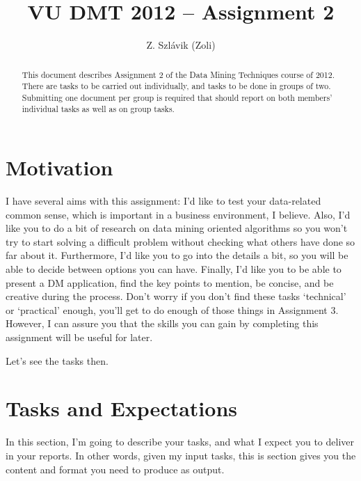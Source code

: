 \documentclass{llncs}
\begin{document}
%
%
%

\title{VU DMT 2012 -- Assignment 2}
\author{Z. Szl\'avik (Zoli)}


\maketitle              %

\begin{abstract}
This document describes Assignment 2 of the Data Mining Techniques course of 2012. There are tasks to be carried out individually, and tasks to be done in groups of two. Submitting one document per group is required that should report on both members' individual tasks as well as on group tasks.
\end{abstract}%
\section{Motivation}
I have several aims with this assignment: I'd like to test your data-related common sense, which is important in a business environment, I believe. Also, I'd like you to do a bit of research on data mining oriented algorithms so you won't try to start solving a difficult problem without checking what others have done so far about it. Furthermore, I'd like you to go into the details a bit, so you will be able to decide between options you can have. Finally, I'd like you to be able to present a DM application, find the key points to mention, be concise, and be creative during the process. Don't worry if you don't find these tasks `technical' or `practical' enough, you'll get to do enough of those things in Assignment 3. However, I can assure you that the skills you can gain by completing this assignment will be useful for later.

Let's see the tasks then.

\section{Tasks and Expectations}
In this section, I'm going to describe your tasks, and what I expect you to deliver in your reports. In other words, given my input tasks, this is section gives you the content and format you need to produce as output.
\end{document}
